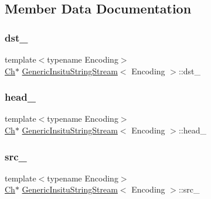 \subsection{Member Data Documentation}
\mbox{\label{structGenericInsituStringStream_ab0e7a73638a7a8db81aa9b26714b0e3b}} 
\subsubsection{\texorpdfstring{dst\+\_\+}{dst\_}}
{\footnotesize\ttfamily template$<$typename Encoding$>$ \\
\hyperlink{structGenericInsituStringStream_a277308a58f551f11d0d9a20823702b5a}{Ch}$\ast$ \hyperlink{structGenericInsituStringStream}{Generic\+Insitu\+String\+Stream}$<$ Encoding $>$\+::dst\+\_\+}

\mbox{\label{structGenericInsituStringStream_af5a7116bdd9bfde5141c298a5b7566b0}} 
\subsubsection{\texorpdfstring{head\+\_\+}{head\_}}
{\footnotesize\ttfamily template$<$typename Encoding$>$ \\
\hyperlink{structGenericInsituStringStream_a277308a58f551f11d0d9a20823702b5a}{Ch}$\ast$ \hyperlink{structGenericInsituStringStream}{Generic\+Insitu\+String\+Stream}$<$ Encoding $>$\+::head\+\_\+}

\mbox{\label{structGenericInsituStringStream_af3cc551dd07fcca39db84459f4d4e718}} 
\subsubsection{\texorpdfstring{src\+\_\+}{src\_}}
{\footnotesize\ttfamily template$<$typename Encoding$>$ \\
\hyperlink{structGenericInsituStringStream_a277308a58f551f11d0d9a20823702b5a}{Ch}$\ast$ \hyperlink{structGenericInsituStringStream}{Generic\+Insitu\+String\+Stream}$<$ Encoding $>$\+::src\+\_\+}




